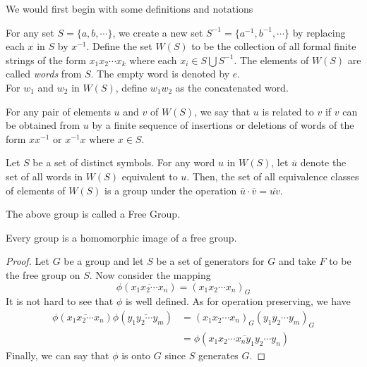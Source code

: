 We would first begin with some definitions and notations
\begin{definition}
	For any set $S=\{a,b,\cdots\}$, we create a new set $S^{-1} = \{a^{-1},b^{-1},\cdots\}$ by replacing each $x$ in $S$ by $x^{-1}$. Define the set $W(S)$ to be the collection of all formal finite strings of the form $x_1x_2\cdots x_k$ where each $x_i\in S\bigcup S^{-1}$. The elements of $W(S)$ are called \textit{words} from $S$. The empty word is denoted by $e$.\\
	For $w_1$ and $w_2$ in $W(S)$, define $w_1w_2$ as the concatenated word.
\end{definition}

\begin{definition}
	For any pair of elements $u$ and $v$ of $W(S)$, we say that $u$ is related to $v$ if $v$ can be obtained from $u$ by a finite sequence of insertions or deletions of words of the form $xx^{-1}$ or $x^{-1}x$ where $x\in S$.
\end{definition}

\begin{proposition}
	Let $S$ be a set of distinct symbols. For any word $u$ in $W(S)$, let $\overline{u}$ denote the set of all words in $W(S)$ equivalent to $u$. Then, the set of all equivalence classes of elements of $W(S)$ is a group under the operation $\overline{u}\cdot\overline{v}=\overline{uv}$.
\end{proposition}

The above group is called a Free Group.

\begin{proposition}
	Every group is a homomorphic image of a free group.
\end{proposition}
\begin{proof}
	Let $G$ be a group and let $S$ be a set of generators for $G$ and take $F$ to be the free group on $S$. Now consider the mapping 
	$$
	\phi(\overline{x_1x_2\cdots x_n}) = (x_1x_2\cdots x_n)_G
	$$
	It is not hard to see that $\phi$ is well defined. As for operation preserving, we have 
	\begin{align*}
		\phi(\overline{x_1x_2\cdots x_n})\phi(\overline{y_1y_2\cdots y_m}) &= (x_1x_2\cdots x_n)_G (y_1y_2\cdots y_m)_G\\
		&= \phi(\overline{x_1x_2\cdots x_ny_1y_2\cdots y_n})
	\end{align*}
	Finally, we can say that $\phi$ is onto $G$ since $S$ generates $G$.
\end{proof}

